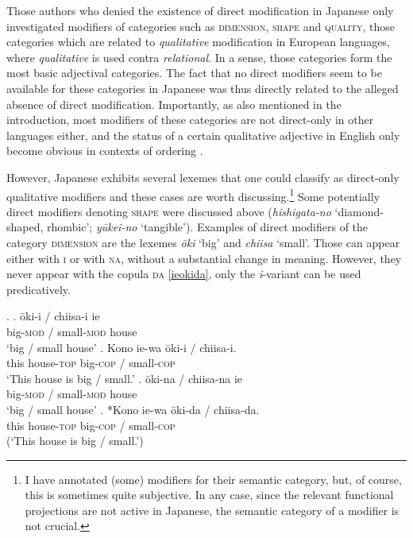 Those authors who denied the existence of direct modification in Japanese \citep{sproat:1991:the, laenzlinger:2011:elements} only investigated modifiers of categories such as \textsc{dimension}, \textsc{shape} and \textsc{quality}, those categories which are related to \textit{qualitative} modification in European languages, where \textit{qualitative} is used contra \textit{relational}. In a sense, those categories form the most basic adjectival categories. The fact that no direct modifiers seem to be available for these categories in Japanese was thus directly related to the alleged absence of direct modification. Importantly, as also mentioned in the introduction, most modifiers of these categories are not direct-only in other languages either, and the status of a certain qualitative adjective in English only become obvious in contexts of ordering \citep{cinque:2010:adj, laenzlinger:2011:elements}.

However, Japanese exhibits several lexemes that one could classify as direct-only qualitative modifiers and these cases are worth discussing.\footnote{I have annotated (some) modifiers for their semantic category, but, of course, this is sometimes quite subjective. In any case, since the relevant functional projections are not active in Japanese, the semantic category of a modifier is not crucial.} Some potentially direct modifiers denoting \textsc{shape} were discussed above (\textit{hishigata-no} `diamond-shaped, rhombic’; \textit{yūkei-no} `tangible’). Examples of direct modifiers of the category \textsc{dimension} are the lexemes \textit{ōki} `big' and \textit{chiisa} `small’. Those can appear either with \textsc{i} or with \textsc{na}, without a substantial change in meaning. However, they never appear with the copula \textsc{da} \ref{ieokida}, only the \textit{i}-variant can be used predicatively.

\ex. \ag. ōki-i / chiisa-i ie\\
big-\textsc{mod} / small-\textsc{mod} house\\
`big / small house'
\bg. Kono ie-wa ōki-i / chiisa-i.\\
this house-\textsc{top} big-\textsc{cop} / small-\textsc{cop}\\
`This house is big / small.’
\cg. ōki-na / chiisa-na ie\\
big-\textsc{mod} / small-\textsc{mod} house\\
`big / small house'
\dg. *Kono ie-wa ōki-da / chiisa-da.\\
this house-\textsc{top} big-\textsc{cop} / small-\textsc{cop}\\
(`This house is big / small.’) \label{ieokida}

